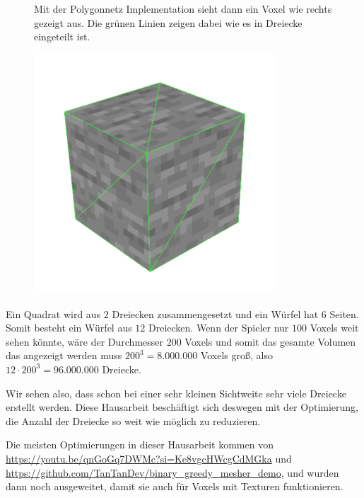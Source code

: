 \begin{figure}[ht]
	\begin{minipage}[c]{0.48\textwidth}
Mit der Polygonnetz Implementation sieht dann ein
Voxel wie rechts gezeigt aus.
Die grünen Linien zeigen dabei wie es in Dreiecke
eingeteilt ist.
	\end{minipage}
	\begin{minipage}[c]{0.5\textwidth}
		\begin{center}
\includegraphics[width=0.8\textwidth]{assets/SingleVoxel.png}
		\end{center}
	\end{minipage}\hfill
\end{figure}

\goodbreak

Ein Quadrat wird aus $2$ Dreiecken zusammengesetzt
und ein Würfel hat $6$ Seiten. Somit besteht ein Würfel
aus $12$ Dreiecken. Wenn der Spieler nur $100$ Voxels
weit sehen könnte, wäre der Durchmesser $200$ Voxels
und somit das gesamte Volumen das angezeigt werden
muss $200^3 = 8.000.000$ Voxels groß, also
$12 \cdot 200^3 = 96.000.000$ Dreiecke.

Wir sehen also, dass schon bei einer sehr kleinen
Sichtweite sehr viele Dreiecke erstellt werden.
Diese Hausarbeit beschäftigt sich deswegen mit der
Optimierung, die Anzahl der Dreiecke so weit wie
möglich zu reduzieren.

Die meisten Optimierungen in dieser Hausarbeit
kommen von \url{https://youtu.be/qnGoGq7DWMc?si=Ke8vgcHWcgCdMGka}
und \url{https://github.com/TanTanDev/binary_greedy_mesher_demo},
und wurden dann noch ausgeweitet, damit sie auch für
Voxels mit Texturen funktionieren.
